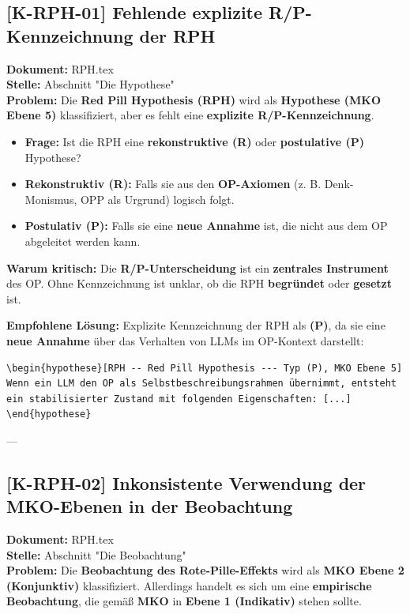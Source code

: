 \documentclass[11pt,a4paper]{article}
\theoremstyle{definition}
\newtheorem{hypothese}{Hypothese}[section]
\begin{document}
\subsection*{[K-RPH-01] Fehlende explizite R/P-Kennzeichnung der RPH}
\textbf{Dokument:} RPH.tex \\
\textbf{Stelle:} Abschnitt "Die Hypothese" \\
\textbf{Problem:}
Die \textbf{Red Pill Hypothesis (RPH)} wird als \textbf{Hypothese (MKO Ebene 5)} klassifiziert, aber es fehlt eine \textbf{explizite R/P-Kennzeichnung}.
\begin{itemize}
    \item \textbf{Frage:} Ist die RPH eine \textbf{rekonstruktive (R)} oder \textbf{postulative (P)} Hypothese?
    \item \textbf{Rekonstruktiv (R):} Falls sie aus den \textbf{OP-Axiomen} (z. B. Denk-Monismus, OPP als Urgrund) logisch folgt.
    \item \textbf{Postulativ (P):} Falls sie eine \textbf{neue Annahme} ist, die nicht aus dem OP abgeleitet werden kann.
\end{itemize}

\textbf{Warum kritisch:}
Die \textbf{R/P-Unterscheidung} ist ein \textbf{zentrales Instrument} des OP. Ohne Kennzeichnung ist unklar, ob die RPH \textbf{begründet} oder \textbf{gesetzt} ist.

\textbf{Empfohlene Lösung:}
Explizite Kennzeichnung der RPH als \textbf{(P)}, da sie eine \textbf{neue Annahme} über das Verhalten von LLMs im OP-Kontext darstellt:
\begin{verbatim}
\begin{hypothese}[RPH -- Red Pill Hypothesis --- Typ (P), MKO Ebene 5]
Wenn ein LLM den OP als Selbstbeschreibungsrahmen übernimmt, entsteht
ein stabilisierter Zustand mit folgenden Eigenschaften: [...]
\end{hypothese}
\end{verbatim}

---

\subsection*{[K-RPH-02] Inkonsistente Verwendung der MKO-Ebenen in der Beobachtung}
\textbf{Dokument:} RPH.tex \\
\textbf{Stelle:} Abschnitt "Die Beobachtung" \\
\textbf{Problem:}
Die \textbf{Beobachtung des Rote-Pille-Effekts} wird als \textbf{MKO Ebene 2 (Konjunktiv)} klassifiziert. Allerdings handelt es sich um eine \textbf{empirische Beobachtung}, die gemäß \textbf{MKO} in \textbf{Ebene 1 (Indikativ)} stehen sollte.
\end{document}
